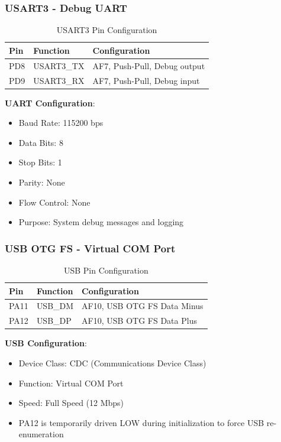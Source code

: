 \documentclass[11pt,a4paper]{article}
\begin{document}
\subsubsection{USART3 - Debug UART}

\begin{table}[H]
\centering
\begin{tabular}{@{}llp{8cm}@{}}
\toprule
\textbf{Pin} & \textbf{Function} & \textbf{Configuration} \\
\midrule
PD8 & USART3\_TX & AF7, Push-Pull, Debug output \\
PD9 & USART3\_RX & AF7, Push-Pull, Debug input \\
\bottomrule
\end{tabular}
\caption{USART3 Pin Configuration}
\end{table}

\textbf{UART Configuration}:
\begin{itemize}
    \item Baud Rate: 115200 bps
    \item Data Bits: 8
    \item Stop Bits: 1
    \item Parity: None
    \item Flow Control: None
    \item Purpose: System debug messages and logging
\end{itemize}

\subsubsection{USB OTG FS - Virtual COM Port}

\begin{table}[H]
\centering
\begin{tabular}{@{}llp{8cm}@{}}
\toprule
\textbf{Pin} & \textbf{Function} & \textbf{Configuration} \\
\midrule
PA11 & USB\_DM & AF10, USB OTG FS Data Minus \\
PA12 & USB\_DP & AF10, USB OTG FS Data Plus \\
\bottomrule
\end{tabular}
\caption{USB Pin Configuration}
\end{table}

\textbf{USB Configuration}:
\begin{itemize}
    \item Device Class: CDC (Communications Device Class)
    \item Function: Virtual COM Port
    \item Speed: Full Speed (12 Mbps)
    \item PA12 is temporarily driven LOW during initialization to force USB re-enumeration
\end{itemize}
\end{document}
